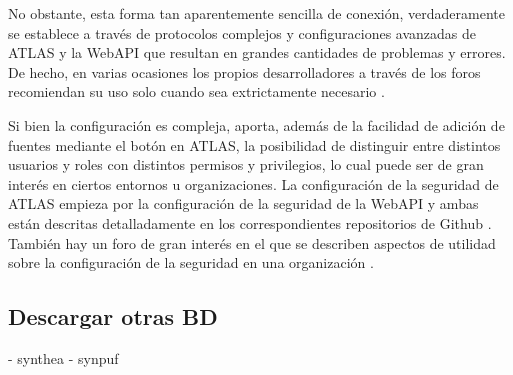 No obstante, esta forma tan aparentemente sencilla de conexión, verdaderamente se establece a través de protocolos complejos y configuraciones avanzadas de ATLAS y la WebAPI que resultan en grandes cantidades de problemas y errores. De hecho, en varias ocasiones los propios desarrolladores a través de los foros recomiendan su uso solo cuando sea extrictamente necesario \cite{forumAddMSDB}\cite{forumAddSecurityAtlas}.

Si bien la configuración es compleja, aporta, además de la facilidad de adición de fuentes mediante el botón en ATLAS, la posibilidad de distinguir entre distintos usuarios y roles con distintos permisos y privilegios, lo cual puede ser de gran interés en ciertos entornos u organizaciones.  La configuración de la seguridad de ATLAS empieza por la configuración de la seguridad de la WebAPI y ambas están descritas detalladamente en los correspondientes repositorios de Github \cite{githubWASecurity}\cite{githubATSecurity}. También hay un foro de gran interés en el que se describen aspectos de utilidad sobre la configuración de la seguridad en una organización \cite{forumAddSecurityAtlas}.

\subsection{Descargar otras BD}
- synthea
- synpuf